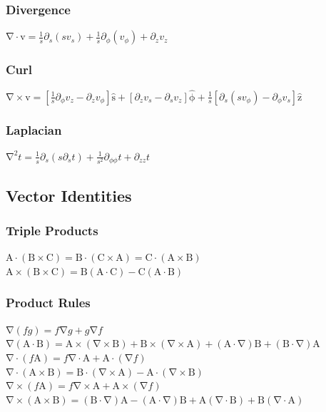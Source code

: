 \documentclass[10pt,landscape,letterpaper]{cheatsheet}
\newcommand{\bv}[1]{\bm{\mathrm{#1}}}
\newcommand{\uv}[1]{\hat{\bv{{#1}}}}
\newcommand{\uz}{\uv{z}}
\newcommand{\grad}{\bv{\nabla}}
\renewcommand{\div}[1]{\grad\cdot #1}
\newcommand{\curl}[1]{\grad\times #1}
\begin{document}
\subsubsection*{Divergence}
$
        \grad\cdot \bv{v}  =\frac{1}{s}\partial_s(sv_s)                      
                           +\frac{1}{s}\partial_\phi(v_\phi) +\partial_z v_z
$
\subsubsection*{Curl}
$
        \grad\times \bv{v}  =\left[\frac{1}{s}\partial_\phi v_z-\partial_z v_\phi\right]\uv{s} 
                            +\left[\partial_zv_s-\partial_sv_z\right]\uv{\phi}                 
                            +\frac{1}{s}\left[\partial_s(sv_\phi)-\partial_\phi v_s\right]\uz
$
\subsubsection*{Laplacian}
$
        \grad^2t  =\frac{1}{s}\partial_s(s\partial_s t)+\frac{1}{s^2}\partial_{\phi\phi}t+\partial_{zz}t
$
\subsection*{Vector Identities}
\subsubsection*{Triple Products}
$\bv{A}\cdot(\bv{B}\times \bv{C})=\bv{B}\cdot(\bv{C}\times \bv{A})=\bv{C}\cdot(\bv{A}\times \bv{B})$\\
$\bv{A}\times(\bv{B}\times \bv{C})=\bv{B}(\bv{A}\cdot\bv{C})-\bv{C}(\bv{A}\cdot\bv{B})$\\
\subsubsection*{Product Rules}
$\grad(fg)=f\grad g+ g\grad f$\\
$\grad(\bv{A}\cdot\bv{B})=\bv{A}\times(\curl{\bv{B}})+\bv{B}\times(\curl{\bv{A}})+(\bv{A}\cdot \grad)\bv{B}+(\bv{B}\cdot\grad)\bv{A}$\\
$\div{(f\bv{A})}=f\div{\bv{A}}+\bv{A}\cdot(\grad f)$\\
$\div{(\bv{A}\times\bv{B})}=\bv{B}\cdot(\curl{\bv{A}})-\bv{A}\cdot(\curl{\bv{B}})$\\
$\curl{(f\bv{A})}=f\curl{\bv{A}}+\bv{A}\times(\grad f)$\\
$\curl{(\bv{A}\times\bv{B})}=(\bv{B}\cdot \grad)\bv{A}-(\bv{A}\cdot\grad)\bv{B}+\bv{A}(\div{\bv{B}})+\bv{B}(\div{\bv{A}})$
\end{document}
